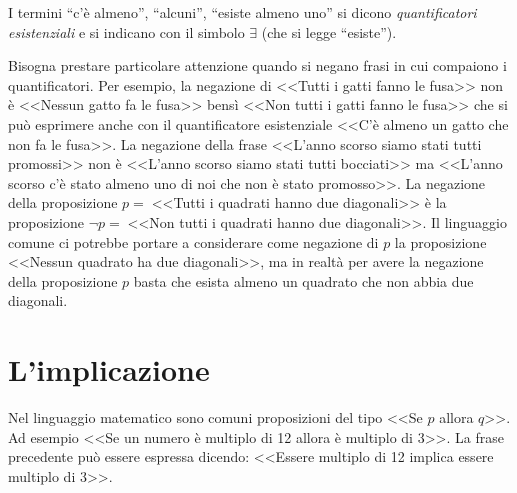 I termini ``c'è almeno'', ``alcuni'', ``esiste almeno uno'' si dicono \emph{quantificatori esistenziali} e si indicano con il simbolo $\exists$ (che si legge ``esiste'').

Bisogna prestare particolare attenzione quando si negano frasi in cui compaiono i quantificatori. Per esempio, la negazione di <<Tutti i gatti fanno le fusa>> non è <<Nessun gatto fa le fusa>> bensì <<Non tutti i gatti fanno le fusa>> che si può esprimere anche con il quantificatore esistenziale <<C'è almeno un gatto che non fa le fusa>>.
La negazione della frase <<L'anno scorso siamo stati tutti promossi>> non è <<L'anno scorso siamo stati tutti bocciati>> ma <<L'anno scorso c'è stato almeno uno di noi che non è stato promosso>>.
La negazione della proposizione $p =\;$<<Tutti i quadrati hanno due diagonali>> è la proposizione $\neg p =\;$<<Non tutti i quadrati hanno due diagonali>>. Il linguaggio comune ci potrebbe portare a considerare come negazione di $p$ la proposizione <<Nessun quadrato ha due diagonali>>, ma in realtà per avere la negazione della proposizione $p$ basta che esista almeno un quadrato che non abbia due diagonali.


\section{L'implicazione}

Nel linguaggio matematico sono comuni proposizioni del tipo <<Se $p$ allora $q$>>. Ad esempio <<Se un numero è multiplo di 12 allora è multiplo di 3>>. La frase precedente può essere espressa dicendo:
<<Essere multiplo di 12 implica essere multiplo di 3>>.

